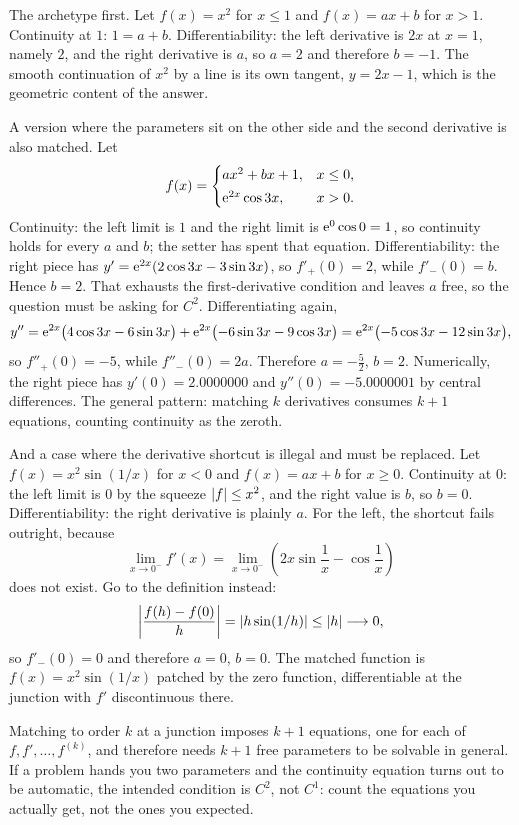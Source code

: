 \begin{worked}
The archetype first. Let $f(x)=x^{2}$ for $x\leq1$ and $f(x)=ax+b$ for $x>1$. Continuity at $1$: $1=a+b$. Differentiability: the left derivative is $2x$ at $x=1$, namely $2$, and the right derivative is $a$, so $a=2$ and therefore $b=-1$. The smooth continuation of $x^{2}$ by a line is its own tangent, $y=2x-1$, which is the geometric content of the answer.

A version where the parameters sit on the other side and the second derivative is also matched. Let
\[
f(x)=\begin{cases} ax^{2}+bx+1, & x\leq0,\\[2pt] \mathrm{e}^{2x}\cos3x, & x>0.\end{cases}
\]
Continuity: the left limit is $1$ and the right limit is $\mathrm{e}^{0}\cos0=1$, so continuity holds for every $a$ and $b$; the setter has spent that equation. Differentiability: the right piece has $y'=\mathrm{e}^{2x}(2\cos3x-3\sin3x)$, so $f'_{+}(0)=2$, while $f'_{-}(0)=b$. Hence $b=2$. That exhausts the first-derivative condition and leaves $a$ free, so the question must be asking for $C^{2}$. Differentiating again,
\[
y''=\mathrm{e}^{2x}\bigl(4\cos3x-6\sin3x\bigr)+\mathrm{e}^{2x}\bigl(-6\sin3x-9\cos3x\bigr)=\mathrm{e}^{2x}\bigl(-5\cos3x-12\sin3x\bigr),
\]
so $f''_{+}(0)=-5$, while $f''_{-}(0)=2a$. Therefore $a=-\tfrac52$, $b=2$. Numerically, the right piece has $y'(0)=2.0000000$ and $y''(0)=-5.0000001$ by central differences. The general pattern: matching $k$ derivatives consumes $k+1$ equations, counting continuity as the zeroth.

And a case where the derivative shortcut is illegal and must be replaced. Let $f(x)=x^{2}\sin(1/x)$ for $x<0$ and $f(x)=ax+b$ for $x\geq0$. Continuity at $0$: the left limit is $0$ by the squeeze $\left\lvert f\right\rvert\leq x^{2}$, and the right value is $b$, so $b=0$. Differentiability: the right derivative is plainly $a$. For the left, the shortcut fails outright, because
\[
\lim_{x\to0^{-}}f'(x)=\lim_{x\to0^{-}}\left(2x\sin\frac1x-\cos\frac1x\right)
\]
does not exist. Go to the definition instead:
\[
\left|\frac{f(h)-f(0)}{h}\right|=\left\lvert h\sin(1/h)\right\rvert\leq\left\lvert h\right\rvert\longrightarrow0 ,
\]
so $f'_{-}(0)=0$ and therefore $a=0$, $b=0$. The matched function is $f(x)=x^{2}\sin(1/x)$ patched by the zero function, differentiable at the junction with $f'$ discontinuous there.
\end{worked}

\begin{keynote}
Matching to order $k$ at a junction imposes $k+1$ equations, one for each of $f,f',\dots,f^{(k)}$, and therefore needs $k+1$ free parameters to be solvable in general. If a problem hands you two parameters and the continuity equation turns out to be automatic, the intended condition is $C^{2}$, not $C^{1}$: count the equations you actually get, not the ones you expected.
\end{keynote}

